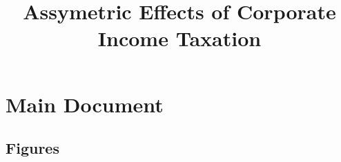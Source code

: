 \documentclass[12 pt,fullpage]{article}
\title{\textbf{Assymetric Effects of Corporate Income Taxation}}
\author{\vspace{-30mm}}
\theoremstyle{plain}
\begin{document}
	\date{\vspace{-25mm}}
	\maketitle
	\vspace{-10mm}




\section{Main Document}

\subsection{Figures}
\begin{comment}


\begin{figure}[h]
	\centering
	\begin{subfigure}[t]{.45\textwidth}
		\texttt{[image: ./Figures/Figure\_1\_BossEmailPersist\_A.pdf]}
		\caption{Emails from Workers to Managers}
	\end{subfigure}
	\quad
	\begin{subfigure}[t]{.45\textwidth}
		\texttt{[image: ./Figures/Figure\_1\_WorkerEmailPersist\_B.pdf]}
		\caption{Emails from Workers to Workers}
	\end{subfigure}
	\caption{Persistence of Email Connections Between the First and Last Month of the Pre-Period}
	\centering
\end{figure}
\footnotesize Note: This figure displays the share of emails sent in worker-manager dyads or worker-worker dyads in the first 4 weeks of the pre-period and the last 4 weeks of the pre-period. There is a 5 week gap between these periods. For worker-to-worker dyads, we distinguish between email persistence to workers within and outside of the division. Workers do not email managers outside of their own division.


\newpage


\end{comment}
\end{document}
